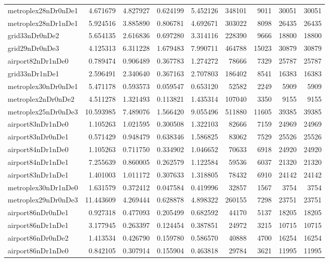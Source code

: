 \begin{longtable}{|l|r|r|r|r|r|r|r|r|}
metroplex28nDr0nDe1 & 4.671679 & 4.827927 & 0.624199 & 5.452126 & 348101 & 9011 & 30051 & 30051 \\
metroplex28nDr1nDe1 & 5.924516 & 3.885890 & 0.806781 & 4.692671 & 303022 & 8098 & 26435 & 26435 \\
grid33nDr0nDe2 & 5.654135 & 2.616836 & 0.697280 & 3.314116 & 228390 & 9666 & 18800 & 18800 \\
grid29nDr0nDe3 & 4.125313 & 6.311228 & 1.679483 & 7.990711 & 464788 & 15023 & 30879 & 30879 \\
airport82nDr1nDe0 & 0.789474 & 0.906489 & 0.367783 & 1.274272 & 78666 & 7329 & 25787 & 25787 \\
grid33nDr1nDe1 & 2.596491 & 2.340640 & 0.367163 & 2.707803 & 186402 & 8541 & 16383 & 16383 \\
metroplex30nDr0nDe1 & 5.471178 & 0.593573 & 0.059547 & 0.653120 & 52582 & 2249 & 5909 & 5909 \\
metroplex2nDr0nDe2 & 4.511278 & 1.321493 & 0.113821 & 1.435314 & 107040 & 3350 & 9155 & 9155 \\
metroplex25nDr0nDe3 & 10.593985 & 7.489076 & 1.566420 & 9.055496 & 511880 & 11605 & 39385 & 39385 \\
airport83nDr1nDe0 & 1.105263 & 1.021595 & 0.300508 & 1.322103 & 82666 & 7159 & 24969 & 24969 \\
airport83nDr0nDe1 & 0.571429 & 0.948479 & 0.638346 & 1.586825 & 83062 & 7529 & 25526 & 25526 \\
airport84nDr1nDe0 & 1.105263 & 0.711750 & 0.334902 & 1.046652 & 70633 & 6918 & 24920 & 24920 \\
airport84nDr1nDe1 & 7.255639 & 0.860005 & 0.262579 & 1.122584 & 59536 & 6037 & 21320 & 21320 \\
airport83nDr1nDe1 & 1.401003 & 1.011172 & 0.307633 & 1.318805 & 78432 & 6910 & 24142 & 24142 \\
metroplex30nDr1nDe0 & 1.631579 & 0.372412 & 0.047584 & 0.419996 & 32857 & 1567 & 3754 & 3754 \\
metroplex29nDr0nDe3 & 11.443609 & 4.269444 & 0.628878 & 4.898322 & 260155 & 7298 & 23751 & 23751 \\
airport86nDr0nDe1 & 0.927318 & 0.477093 & 0.205499 & 0.682592 & 44170 & 5137 & 18205 & 18205 \\
airport86nDr1nDe1 & 3.177945 & 0.263397 & 0.124454 & 0.387851 & 24972 & 3215 & 10715 & 10715 \\
airport86nDr0nDe2 & 1.413534 & 0.426790 & 0.159780 & 0.586570 & 40888 & 4700 & 16254 & 16254 \\
airport86nDr1nDe0 & 0.842105 & 0.307914 & 0.155904 & 0.463818 & 29784 & 3621 & 11995 & 11995 \\

\end{longtable}
